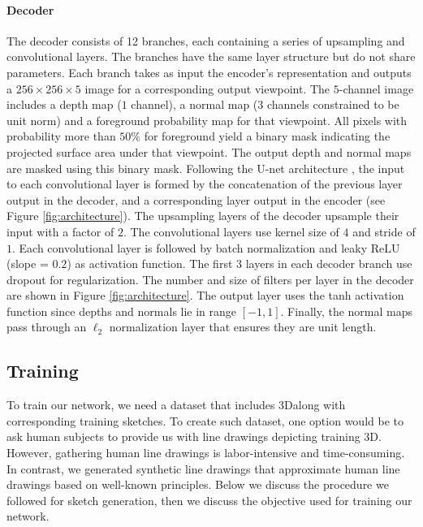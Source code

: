 \documentclass[10pt, conference, compsocconf]{IEEEtran}
\begin{document}
\vspace{-1mm}\paragraph{Decoder}
The decoder consists of 12 branches, each containing a series of  upsampling  and convolutional layers.  The branches have the same layer structure but do not share parameters. Each branch takes as input the encoder's representation and outputs a $256 \times 256 \times 5$ image for a corresponding output viewpoint.  The $5$-channel image  includes a depth map ($1$ channel), a normal map ($3$ channels  constrained  to be unit norm) and a foreground probability map for that viewpoint. All pixels with probability more than $50\%$ for foreground yield a binary mask
indicating the projected surface area under that viewpoint. The output depth and normal maps are masked using this binary mask. Following the U-net architecture \cite{Ronneberger15}, the input to each convolutional layer is formed by the concatenation of the previous layer output
in the decoder, and a corresponding layer output in the encoder (see Figure \ref{fig:architecture}). The upsampling layers of the decoder upsample their input with a factor of $2$. The convolutional layers use kernel size of $4$ and stride of $1$. Each convolutional layer is followed by batch normalization and leaky ReLU (slope = $0.2$) as activation function.  The first 3 layers in each decoder branch use dropout for regularization. The number and size of filters per layer in the decoder are shown in Figure \ref{fig:architecture}. The output layer uses the tanh activation function since depths and normals lie in range $[-1,1]$. Finally, the normal maps pass through an $\ell_2$ normalization layer that ensures they are unit length.


\vspace{-3mm}
\subsection{Training}
\label{sec:learning}
\label{sec:training}
\vspace{-2mm}
To train
our network, we need a dataset that includes 3D\shapes along with corresponding training sketches. To
create such dataset,
one option would be to ask human subjects to provide us with line drawings depicting training 3D\shapes. However, gathering human line drawings is  labor-intensive and time-consuming. In contrast, we generated synthetic line drawings that approximate human line drawings based on well-known  principles. Below we discuss the procedure we followed for sketch generation, then we discuss the objective used for training our network.
\end{document}
